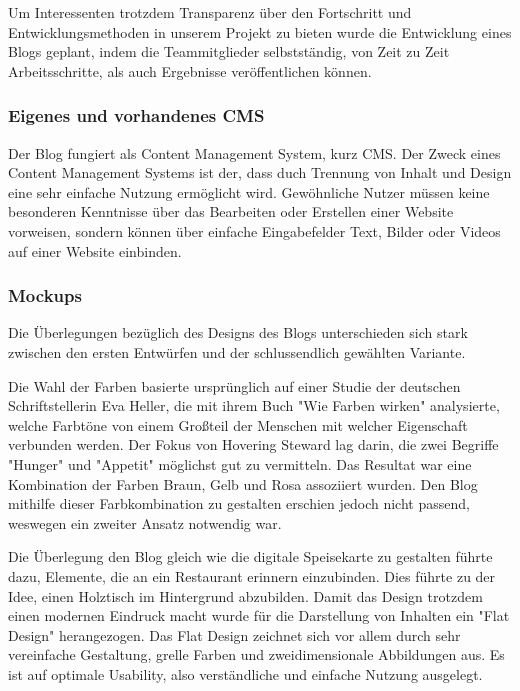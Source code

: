     Um Interessenten trotzdem Transparenz über den Fortschritt und Entwicklungsmethoden in unserem Projekt zu bieten wurde
    die Entwicklung eines Blogs geplant, indem die Teammitglieder selbstständig, von Zeit zu Zeit Arbeitsschritte, als auch
    Ergebnisse veröffentlichen können.

    \subsubsection{Eigenes und vorhandenes CMS}
    Der Blog fungiert als Content Management System, kurz CMS. Der Zweck eines
    Content Management Systems ist der, dass duch Trennung von Inhalt und Design eine
    sehr einfache Nutzung ermöglicht wird. Gewöhnliche Nutzer müssen keine besonderen
    Kenntnisse über das Bearbeiten oder Erstellen einer Website vorweisen, sondern
    können über einfache Eingabefelder Text, Bilder oder Videos auf einer Website einbinden.

    \subsubsection{Mockups}
    Die Überlegungen bezüglich des Designs des Blogs unterschieden sich stark zwischen den ersten
    Entwürfen und der schlussendlich gewählten Variante.

    Die Wahl der Farben basierte ursprünglich auf einer Studie der deutschen Schriftstellerin Eva Heller,
    die mit ihrem Buch {"Wie Farben wirken"\cite{WieFarbenWirken}} analysierte, welche Farbtöne von einem Großteil der Menschen
    mit welcher Eigenschaft verbunden werden. Der Fokus von Hovering Steward lag darin, die zwei Begriffe "Hunger"
    und "Appetit" möglichst gut zu vermitteln. Das Resultat war eine Kombination der Farben Braun, Gelb und Rosa
    assoziiert wurden. Den Blog mithilfe dieser Farbkombination zu gestalten erschien jedoch nicht passend, weswegen
    ein zweiter Ansatz notwendig war.

    Die Überlegung den Blog gleich wie die digitale Speisekarte zu gestalten führte dazu, Elemente, die an ein Restaurant
    erinnern einzubinden. Dies führte zu der Idee, einen Holztisch im Hintergrund abzubilden.
    Damit das Design trotzdem einen modernen Eindruck macht wurde für die Darstellung von Inhalten ein {"Flat Design"\cite{FlatDesign}}
    herangezogen. Das Flat Design zeichnet sich vor allem durch sehr vereinfache Gestaltung, grelle Farben und zweidimensionale Abbildungen aus.
    Es ist auf optimale Usability, also verständliche und einfache Nutzung ausgelegt.

